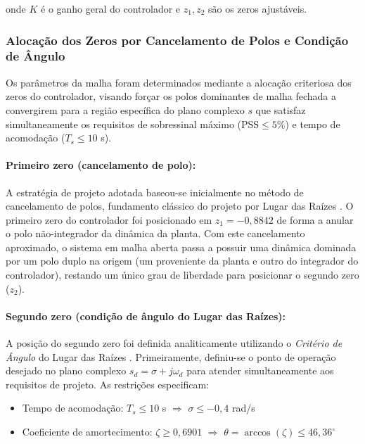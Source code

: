 \documentclass[12pt, a4paper]{article}
\begin{document}
			onde $K$ é o ganho geral do controlador e $z_1, z_2$ são os zeros ajustáveis.

			\subsubsection{Alocação dos Zeros por Cancelamento de Polos e Condição de Ângulo}

				Os parâmetros da malha foram determinados mediante a alocação criteriosa dos zeros do controlador, visando forçar os polos dominantes de malha fechada a convergirem para a região específica do plano complexo $s$ que satisfaz simultaneamente os requisitos de sobressinal máximo ($\text{PSS} \leq 5\%$) e tempo de acomodação ($T_s \leq 10$ s).

				\paragraph{Primeiro zero (cancelamento de polo):}

					A estratégia de projeto adotada baseou-se inicialmente no método de cancelamento de polos, fundamento clássico do projeto por Lugar das Raízes \cite{ogata}. O primeiro zero do controlador foi posicionado em $z_1 = -0{,}8842$ de forma a anular o polo não-integrador da dinâmica da planta. Com este cancelamento aproximado, o sistema em malha aberta passa a possuir uma dinâmica dominada por um polo duplo na origem (um proveniente da planta e outro do integrador do controlador), restando um único grau de liberdade para posicionar o segundo zero ($z_2$).

				\paragraph{Segundo zero (condição de ângulo do Lugar das Raízes):}

					A posição do segundo zero foi definida analiticamente utilizando o \textit{Critério de Ângulo} do Lugar das Raízes \cite{ogata}. Primeiramente, definiu-se o ponto de operação desejado no plano complexo $s_d = \sigma + j\omega_d$ para atender simultaneamente aos requisitos de projeto. As restrições especificam:

					\begin{itemize}
						\item Tempo de acomodação: $T_s \leq 10$ s $\Rightarrow$ $\sigma \leq -0{,}4$ rad/s
						\item Coeficiente de amortecimento: $\zeta \geq 0{,}6901$ $\Rightarrow$ $\theta = \arccos(\zeta) \leq 46{,}36^\circ$
					\end{itemize}
\end{document}
